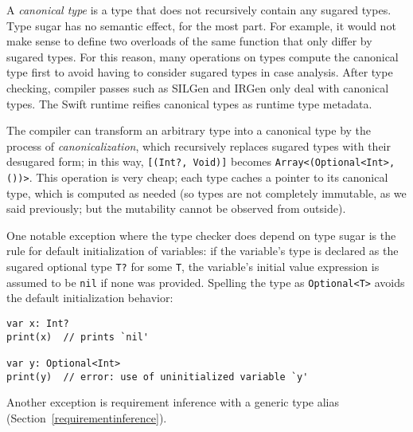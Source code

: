 \documentclass[../generics]{subfiles}
\begin{document}
A \emph{canonical type} is a type that does not recursively contain any sugared types. Type sugar has no semantic effect, for the most part. For example, it would not make sense to define two overloads of the same function that only differ by sugared types. For this reason, many operations on types compute the canonical type first to avoid having to consider sugared types in case analysis. After type checking, compiler passes such as SILGen and IRGen only deal with canonical types. The Swift runtime reifies canonical types as runtime type metadata.

The compiler can transform an arbitrary type into a canonical type by the process of \emph{canonicalization}, which recursively replaces sugared types with their desugared form; in this way, \texttt{[(Int?, Void)]} becomes \verb|Array<(Optional<Int>, ())>|. This operation is very cheap; each type caches a pointer to its canonical type, which is computed as needed (so types are not completely immutable, as we said previously; but the mutability cannot be observed from outside).

One notable exception where the type checker does depend on type sugar is the rule for default initialization of variables: if the variable's type is declared as the sugared optional type \texttt{T?} for some \texttt{T}, the variable's initial value expression is assumed to be \texttt{nil} if none was provided. Spelling the type as \texttt{Optional<T>} avoids the default initialization behavior:
\begin{Verbatim}
var x: Int?
print(x)  // prints `nil'

var y: Optional<Int>
print(y)  // error: use of uninitialized variable `y'
\end{Verbatim}

Another exception is requirement inference with a generic type alias (Section~\ref{requirementinference}).
 
\end{document}

